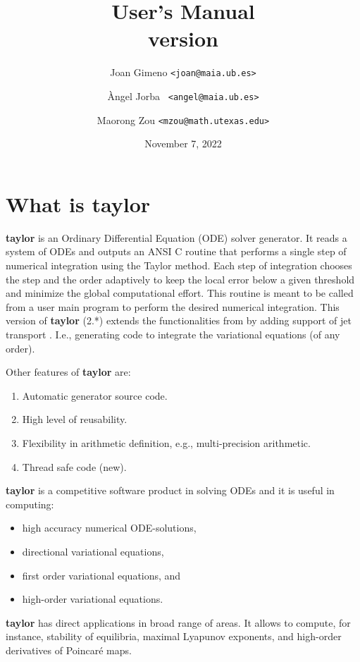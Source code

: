 \documentclass[10pt]{article}
\title{\taylorname{} User's Manual\\[.5em] \normalsize version \version{}}
\author{Joan Gimeno {\tt <joan@maia.ub.es>} \and \`Angel Jorba {\tt
    <angel@maia.ub.es>} \and Maorong Zou {\tt <mzou@math.utexas.edu>}}
\date{November 7, 2022}
\theoremstyle{remark}
\newcommand{\taylorname}{{\bf taylor}}
\begin{document}
\maketitle

\vspace{-2em}\tableofcontents \newpage %

\section{What is \taylorname{}} \label{sec:whatis}
\taylorname{} is an Ordinary Differential Equation (ODE) solver
generator.  It reads a system of ODEs and outputs an ANSI C routine
that performs a single step of numerical integration using the Taylor
method. Each step of integration chooses the step and the order
adaptively to keep the local error below a given threshold and
minimize the global computational effort.  This routine is meant to be
called from a user main program to perform the desired numerical
integration. This version of \taylorname{} (2.*) extends the
functionalities from \cite{JZ} by adding support of jet transport
\cite{GJJMZ}. I.e., generating code to integrate the variational
equations (of any order).

\smallskip 

Other features of \taylorname{} are:
\begin{enumerate}
\renewcommand{\theenumi}{\roman{enumi}}
    \item Automatic generator source code.
    \item High level of reusability.
    \item Flexibility in arithmetic definition, e.g.,
      multi-precision arithmetic.
    \item Thread safe code ({\sc new}).
\end{enumerate}
\taylorname{} is a competitive software product in solving ODEs and it
is useful in computing:
\begin{itemize}
    \item high accuracy numerical ODE-solutions,
    \item directional variational equations,
    \item first order variational equations, and
    \item high-order variational equations.
\end{itemize}
\taylorname{} has direct applications in broad range of areas.  It
allows to compute, for instance, stability of equilibria, maximal
Lyapunov exponents, and high-order derivatives of Poincar\'e maps.
\end{document}
